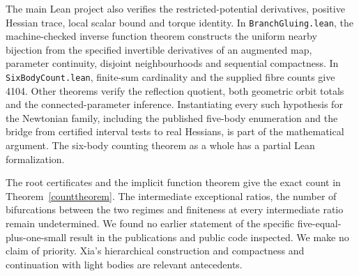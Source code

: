 \documentclass[11pt]{article}
\begin{document}
The main Lean project also verifies the restricted-potential derivatives, positive Hessian trace, local scalar bound and torque identity. In \texttt{BranchGluing.lean}, the machine-checked inverse function theorem constructs the uniform nearby bijection from the specified invertible derivatives of an augmented map, parameter continuity, disjoint neighbourhoods and sequential compactness. In \texttt{SixBodyCount.lean}, finite-sum cardinality and the supplied fibre counts give 4104. Other theorems verify the reflection quotient, both geometric orbit totals and the connected-parameter inference. Instantiating every such hypothesis for the Newtonian family, including the published five-body enumeration and the bridge from certified interval tests to real Hessians, is part of the mathematical argument. The six-body counting theorem as a whole has a partial Lean formalization.

The root certificates and the implicit function theorem give the exact count in Theorem~\ref{counttheorem}. The intermediate exceptional ratios, the number of bifurcations between the two regimes and finiteness at every intermediate ratio remain undetermined. We found no earlier statement of the specific five-equal-plus-one-small result in the publications and public code inspected. We make no claim of priority. Xia's hierarchical construction \cite{xia} and compactness and continuation with light bodies \cite{light} are relevant antecedents.
\end{document}
